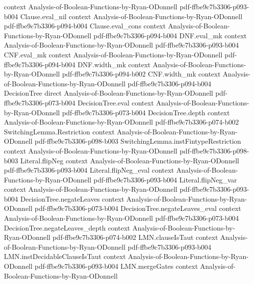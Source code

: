 \begin{lemma}
  {context}
  {Analysis-of-Boolean-Functions-by-Ryan-ODonnell}
  {pdf-ffbe9c7b3306-p093-b004}
\proofstep
  {Clause.eval_nil}
  {context}
  {Analysis-of-Boolean-Functions-by-Ryan-ODonnell}
  {pdf-ffbe9c7b3306-p094-b004}
\proofstep
  {Clause.eval_cons}
  {context}
  {Analysis-of-Boolean-Functions-by-Ryan-ODonnell}
  {pdf-ffbe9c7b3306-p094-b004}
\proofstep
  {DNF.eval_mk}
  {context}
  {Analysis-of-Boolean-Functions-by-Ryan-ODonnell}
  {pdf-ffbe9c7b3306-p093-b004}
\proofstep
  {CNF.eval_mk}
  {context}
  {Analysis-of-Boolean-Functions-by-Ryan-ODonnell}
  {pdf-ffbe9c7b3306-p094-b004}
\proofstep
  {DNF.width_mk}
  {context}
  {Analysis-of-Boolean-Functions-by-Ryan-ODonnell}
  {pdf-ffbe9c7b3306-p094-b002}
\proofstep
  {CNF.width_mk}
  {context}
  {Analysis-of-Boolean-Functions-by-Ryan-ODonnell}
  {pdf-ffbe9c7b3306-p094-b004}
\proofstep
  {DecisionTree}
  {direct}
  {Analysis-of-Boolean-Functions-by-Ryan-ODonnell}
  {pdf-ffbe9c7b3306-p073-b004}
\proofstep
  {DecisionTree.eval}
  {context}
  {Analysis-of-Boolean-Functions-by-Ryan-ODonnell}
  {pdf-ffbe9c7b3306-p073-b004}
\proofstep
  {DecisionTree.depth}
  {context}
  {Analysis-of-Boolean-Functions-by-Ryan-ODonnell}
  {pdf-ffbe9c7b3306-p074-b002}
\proofstep
  {SwitchingLemma.Restriction}
  {context}
  {Analysis-of-Boolean-Functions-by-Ryan-ODonnell}
  {pdf-ffbe9c7b3306-p098-b003}
\proofstep
  {SwitchingLemma.instFintypeRestriction}
  {context}
  {Analysis-of-Boolean-Functions-by-Ryan-ODonnell}
  {pdf-ffbe9c7b3306-p098-b003}
\proofstep
  {Literal.flipNeg}
  {context}
  {Analysis-of-Boolean-Functions-by-Ryan-ODonnell}
  {pdf-ffbe9c7b3306-p093-b004}
\proofstep
  {Literal.flipNeg_eval}
  {context}
  {Analysis-of-Boolean-Functions-by-Ryan-ODonnell}
  {pdf-ffbe9c7b3306-p093-b004}
\proofstep
  {Literal.flipNeg_var}
  {context}
  {Analysis-of-Boolean-Functions-by-Ryan-ODonnell}
  {pdf-ffbe9c7b3306-p093-b004}
\proofstep
  {DecisionTree.negateLeaves}
  {context}
  {Analysis-of-Boolean-Functions-by-Ryan-ODonnell}
  {pdf-ffbe9c7b3306-p073-b004}
\proofstep
  {DecisionTree.negateLeaves_eval}
  {context}
  {Analysis-of-Boolean-Functions-by-Ryan-ODonnell}
  {pdf-ffbe9c7b3306-p073-b004}
\proofstep
  {DecisionTree.negateLeaves_depth}
  {context}
  {Analysis-of-Boolean-Functions-by-Ryan-ODonnell}
  {pdf-ffbe9c7b3306-p074-b002}
\proofstep
  {LMN.clauseIsTaut}
  {context}
  {Analysis-of-Boolean-Functions-by-Ryan-ODonnell}
  {pdf-ffbe9c7b3306-p093-b004}
\proofstep
  {LMN.instDecidableClauseIsTaut}
  {context}
  {Analysis-of-Boolean-Functions-by-Ryan-ODonnell}
  {pdf-ffbe9c7b3306-p093-b004}
\proofstep
  {LMN.mergeGates}
  {context}
  {Analysis-of-Boolean-Functions-by-Ryan-ODonnell}

\end{lemma}
